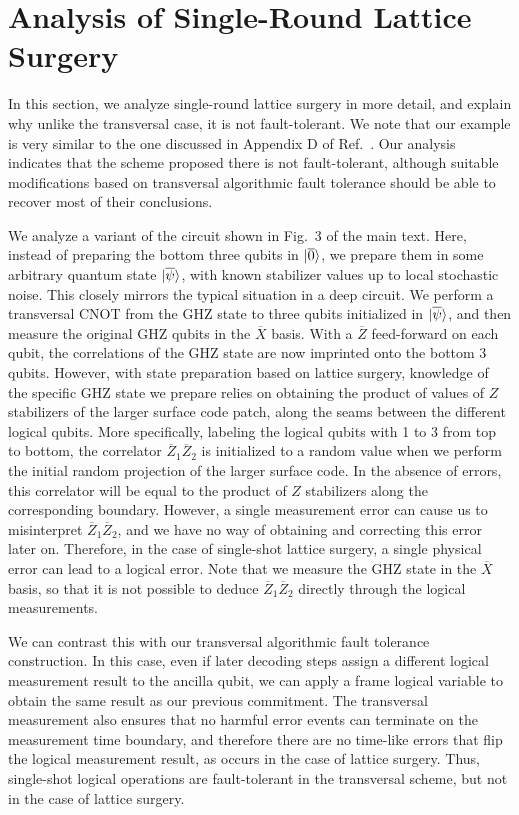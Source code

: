 \section{Analysis of Single-Round Lattice Surgery}
%
In this section, we analyze single-round lattice surgery in more detail, and explain why unlike the transversal case, it is not fault-tolerant.
%
We note that our example is very similar to the one discussed in Appendix D of Ref.~\cite{kim2022fault}.
%
Our analysis indicates that the scheme proposed there is not fault-tolerant, although suitable modifications based on transversal algorithmic fault tolerance should be able to recover most of their conclusions.

We analyze a variant of the circuit shown in Fig.~3 of the main text.
%
Here, instead of preparing the bottom three qubits in $|{\overline{0}}\rangle$, we prepare them in some arbitrary quantum state $|{\overline{\psi}}\rangle$, with known stabilizer values up to local stochastic noise.
%
This closely mirrors the typical situation in a deep circuit.
%
We perform a transversal CNOT from the GHZ state to three qubits initialized in $|{\overline{\psi}}\rangle$, and then measure the original GHZ qubits in the $\overline{X}$ basis.
%
With a $\overline{Z}$ feed-forward on each qubit, the correlations of the GHZ state are now imprinted onto the bottom 3 qubits.
%
However, with state preparation based on lattice surgery, knowledge of the specific GHZ state we prepare relies on obtaining the product of values of $Z$ stabilizers of the larger surface code patch, along the seams between the different logical qubits.
%
More specifically, labeling the logical qubits with 1 to 3 from top to bottom, the correlator $\overline{Z}_1\overline{Z}_2$ is initialized to a random value when we perform the initial random projection of the larger surface code.
%
In the absence of errors, this correlator will be equal to the product of $Z$ stabilizers along the corresponding boundary.
%
However, a single measurement error can cause us to misinterpret $\overline{Z}_1\overline{Z}_2$, and we have no way of obtaining and correcting this error later on.
%
Therefore, in the case of single-shot lattice surgery, a single physical error can lead to a logical error.
%
Note that we measure the GHZ state in the $\overline{X}$ basis, so that it is not possible to deduce $\overline{Z}_1\overline{Z}_2$ directly through the logical measurements.

We can contrast this with our transversal algorithmic fault tolerance construction.
%
In this case, even if later decoding steps assign a different logical measurement result to the ancilla qubit, we can apply a frame logical variable to obtain the same result as our previous commitment.
%
The transversal measurement also ensures that no harmful error events can terminate on the measurement time boundary, and therefore there are no time-like errors that flip the logical measurement result, as occurs in the case of lattice surgery.
%
Thus, single-shot logical operations are fault-tolerant in the transversal scheme, but not in the case of lattice surgery.

